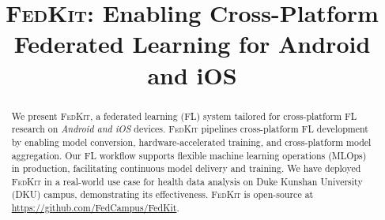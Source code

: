 \documentclass[conference]{IEEEtran}
\begin{document}

\newcommand*\circled[1]{\tikz[baseline=(char.base)]{
        \node[shape=circle,draw,inner sep=.6pt] (char) {#1};}}
\newcommand{\FedCampus}{\textsc{FedCampus}}
\newcommand{\FedKit}{\textsc{FedKit}}
\newcommand{\challa}{\textbf{(a)}}
\newcommand{\challb}{\textbf{(b)}}
\newcommand{\challc}{\textbf{(c)}}

\title
{\FedKit{}: Enabling Cross-Platform Federated Learning for Android and iOS}

\author{
}

\maketitle

\begin{abstract}
We present \FedKit{}, a federated learning (FL) system tailored for
cross-platform FL research on \textit{Android and iOS} devices.
\FedKit{} pipelines cross-platform FL development by
enabling model conversion,
hardware-accelerated training,
and cross-platform model aggregation.
Our FL workflow supports flexible machine learning operations (MLOps) in production,
facilitating continuous model delivery and training.
We have deployed \FedKit{} in a real-world use case for
health data analysis on Duke Kunshan University (DKU) campus,
demonstrating its effectiveness.
\FedKit{} is open-source at \url{https://github.com/FedCampus/FedKit}.
\end{abstract}

\end{document}
